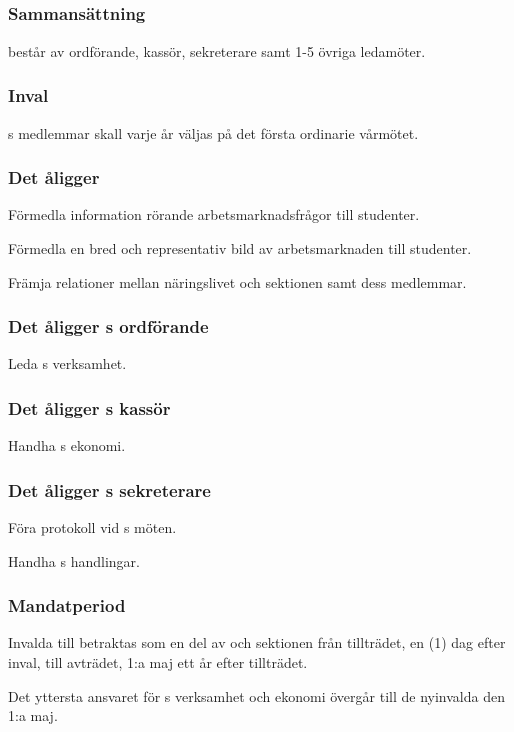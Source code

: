 \subsection{\ARMITFULL{}}
\subsubsection{Sammansättning}
\ARMIT{} består av ordförande, kassör, sekreterare samt 1-5 övriga ledamöter.

\subsubsection{Inval}
\ARMIT{}s medlemmar skall varje år väljas på det första ordinarie vårmötet.

\subsubsection{Det åligger \ARMIT{}}
\begin{att}
	\item Förmedla information rörande arbetsmarknadsfrågor till studenter.
	\item Förmedla en bred och representativ bild av arbetsmarknaden till studenter.
	\item Främja relationer mellan näringslivet och sektionen samt dess medlemmar.
\end{att}

\subsubsection{Det åligger \ARMIT{}s ordförande}
\begin{att}
	\item Leda \ARMIT{}s verksamhet.
\end{att}

\subsubsection{Det åligger \ARMIT{}s kassör}
\begin{att}
	\item Handha \ARMIT{}s ekonomi.
\end{att}

\subsubsection{Det åligger \ARMIT{}s sekreterare}
\begin{att}
	\item Föra protokoll vid \ARMIT{}s möten.
	\item Handha \ARMIT{}s handlingar.
\end{att}

\subsubsection{Mandatperiod}
Invalda till \ARMIT{} betraktas som en del av \ARMIT{} och sektionen från tillträdet, en (1) dag efter inval, till avträdet, 1:a maj ett år efter tillträdet.

Det yttersta ansvaret för \ARMIT{}s verksamhet och ekonomi övergår till de nyinvalda den 1:a maj.
